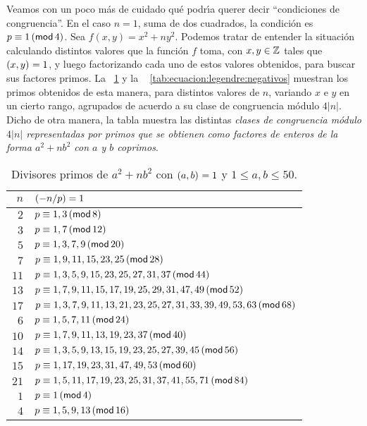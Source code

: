Veamos con un poco m\'as de cuidado qu\'e podr\'{\i}a querer decir
``condiciones de congruencia''. En el caso $n=1$, suma de dos cuadrados,
la condici\'on es $p\equiv 1\tmodulo[4]$. Sea $f(x,y)=x^2+ny^2$. Podemos
tratar de entender la situaci\'on calculando distintos valores que la
funci\'on $f$ toma, con $x,y\in\Enteros$ tales que $\mcd{x,y}=1$, y luego
factorizando cada uno de estos valores obtenidos, para buscar sus factores
primos.
La \tablename~\ref{tab:ecuacion:legendre:positivos} y la \tablename~%
\ref{tab:ecuacion:legendre:negativos} muestran los primos obtenidos
de esta manera, para distintos valores de $n$, variando $x$ e $y$ en un
cierto rango, agrupados de acuerdo a su clase de congruencia m\'odulo
$4|n|$. Dicho de otra manera, la tabla muestra las distintas
\emph{clases de congruencia m\'odulo $4|n|$ representadas por primos que %
se obtienen como factores de enteros de la forma $a^2+nb^2$ con $a$ y $b$ %
coprimos}.

\begin{table}
	\begin{tabular}{r|l}
		$n$ & $\tlegendre{-n} p=1$ \\
		\hline
		$2$ & $p\equiv 1,3\tmodulo[8]$ \\
		$3$ & $p\equiv 1,7\tmodulo[12]$ \\
		$5$ & $p\equiv 1,3,7,9\tmodulo[20]$ \\
		$7$ & $p\equiv 1,9,11,15,23,25\tmodulo[28]$ \\
		$11$ & $p\equiv 1,3,5,9,15,23,25,27,31,37\tmodulo[44]$ \\
		$13$ & $p\equiv 1,7,9,11,15,17,19,25,29,31,47,49
			\tmodulo[52]$ \\
		$17$ & $p\equiv 1,3,7,9,11,13,21,23,25,27,31,33,39,49,53,63
			\tmodulo[68]$ \\
		\hline
		$6$ & $p\equiv 1,5,7,11\tmodulo[24]$ \\
		$10$ & $p\equiv 1,7,9,11,13,19,23,37\tmodulo[40]$ \\
		$14$ & $p\equiv 1,3,5,9,13,15,19,23,25,27,39,45\tmodulo[56]$ \\
		$15$ & $p\equiv 1,17,19,23,31,47,49,53\tmodulo[60]$ \\
		$21$ & $p\equiv 1,5,11,17,19,23,25,31,37,41,55,71
			\tmodulo[84]$ \\
		\hline
		$1$ & $p\equiv 1\tmodulo[4]$ \\
		$4$ & $p\equiv 1,5,9,13\tmodulo[16]$ 
	\end{tabular}
	\caption{
		Divisores primos de $a^2+nb^2$ con $\mcd{a,b}=1$ y
		$1\leq a,b\leq 50$.
	}\label{tab:ecuacion:legendre:positivos}
\end{table}

